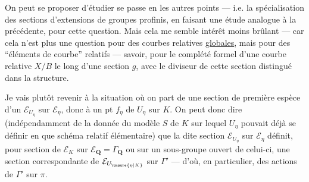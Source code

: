 On peut se proposer d'étudier   se passe en les autres points --- i.e. la spécialisation des sections  d'extensions de groupes profinis, en faisant une étude analogue à la précédente, pour cette question. Mais cela me semble   intérêt moins brûlant --- car cela n'est
plus une question pour des courbes relatives \uline{globales}, mais pour des ``éléments de courbe'' relatifs --- savoir, pour le complété formel d'une courbe relative $X/B$ le long d'une section $g$, avec le diviseur de cette section distingué dans la structure.

Je vais plutôt revenir à la situation où on part de une section de première espèce d'un $\mathcal E_{U_\eta}$ sur $\mathcal E_\eta$,  donc à un pt  $f_\eta$ de $U_\eta$ sur $K$. On peut donc dire (indépendamment de la donnée du modèle $S$ de $K$ sur lequel $U_\eta$ pouvait déjà se définir en  que schéma relatif élémentaire) que la dite section  $\mathcal E_{U_\eta}$ sur $\mathcal E_\eta$  définit, pour  section de $\mathcal E_K$ sur $\mathcal E_{\mathbf Q}=\Gamma_{\mathbf Q}$ ou sur un sous-groupe ouvert  de celui-ci, une section
correspondante de $\mathcal E_{U_{\unsure{\eta|K}}}$ sur $\Gamma'$ --- d'où, en particulier, des actions de $\Gamma'$ sur $\pi$.

